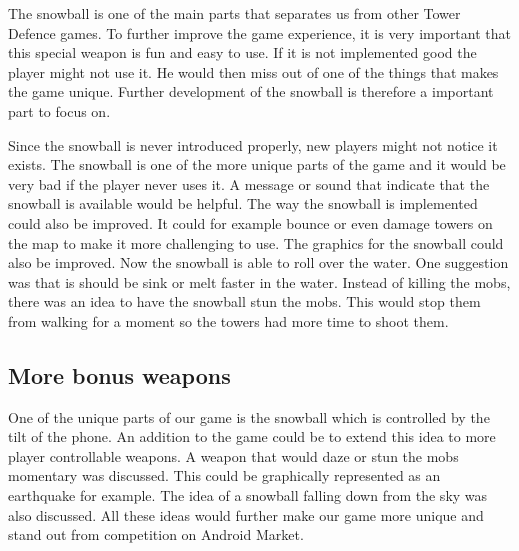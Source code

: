 The snowball is one of the main parts that separates us from other Tower Defence games. To further improve the game experience, it is very important that this special weapon is fun and easy to use. If it is not implemented good the player might not use it. He would then miss out of one of the things that makes the game unique. Further development of the snowball is therefore a important part to focus on.

Since the snowball is never introduced properly, new players might not notice it exists. The snowball is one of the more unique parts of the game and it would be very bad if the player never uses it. A message or sound that indicate that the snowball is available would be helpful. The way the snowball is implemented could also be improved. It could for example bounce or even damage towers on the map to make it more challenging to use. The graphics for the snowball could also be improved. Now the snowball is able to roll over the water. One suggestion was that is should be sink or melt faster in the water. Instead of killing the mobs, there was an idea to have the snowball stun the mobs. This would stop them from walking for a moment so the towers had more time to shoot them.
\subsection{More bonus weapons}

One of the unique parts of our game is the snowball which is controlled by the tilt of the phone. An addition to the game could be to extend this idea to more player controllable weapons. A weapon that would daze or stun the mobs momentary was discussed. This could be graphically represented as an earthquake for example.  The idea of a snowball falling down from the sky was also discussed. All these ideas would further make our game more unique and stand out from competition on Android Market.
